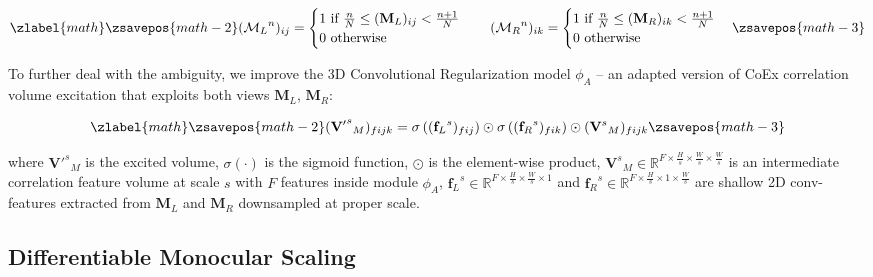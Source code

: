 \documentclass[10pt,twocolumn,letterpaper]{article}
\begin{document}
\small

\begin{equation}
\zlabel{math}
    \zsavepos{math-2}
    ({\mathcal{M}_L}^n)_{ij} = \begin{cases}
        1\ \text{if}\ \frac{n}{N} \leq (\mathbf{M}_L)_{ij} < \frac{n+1}{N}\\
        0\ \text{otherwise}
    \end{cases} \quad ({\mathcal{M}_R}^n)_{ik} = \begin{cases}
        1\ \text{if}\ \frac{n}{N} \leq (\mathbf{M}_R)_{ik} < \frac{n+1}{N}\\
        0\ \text{otherwise}
    \end{cases}
    \label{eq:mask}
    \zsavepos{math-3}\end{equation}

\normalsize

To further deal with the ambiguity, we improve the 3D Convolutional Regularization model $\phi_A$  -- an adapted version of CoEx \cite{bangunharcana2021correlate} correlation volume excitation that exploits both views $\textbf{M}_L$, $\textbf{M}_R$:

\small

\begin{equation}
\zlabel{math}
    \zsavepos{math-2}
    ({\mathbf{V'}^s}_M)_{fijk} = \sigma\left(({{\mathbf{f}_L}^s})_{fij}\right) \odot \sigma\left(({{\mathbf{f}_R}^s})_{fik}\right) \odot ({\mathbf{V}^s}_M)_{fijk}
    \label{eq:our_coex}
    \zsavepos{math-3}\end{equation}

\normalsize
where ${\mathbf{V'}^s}_M$ is the excited volume, $\sigma(\cdot)$ is the sigmoid function, $\odot$ is the element-wise product, ${\mathbf{V}^s}_M \in \mathbb{R}^{F \times \frac{H}{s} \times \frac{W}{s} \times \frac{W}{s}}$ is an intermediate correlation feature volume at scale $s$ with $F$ features inside module $\phi_A$,  ${\mathbf{f}_L}^s \in \mathbb{R}^{F \times \frac{H}{s} \times \frac{W}{s} \times 1}$ and ${\mathbf{f}_R}^s \in \mathbb{R}^{F \times \frac{H}{s} \times 1 \times \frac{W}{s}}$ are shallow 2D conv-features extracted from $\mathbf{M}_L$ and $\mathbf{M}_R$ downsampled at proper scale.


\phantom{Invisible Text}
\vspace{-\baselineskip}

\subsection{Differentiable Monocular Scaling}
\end{document}
